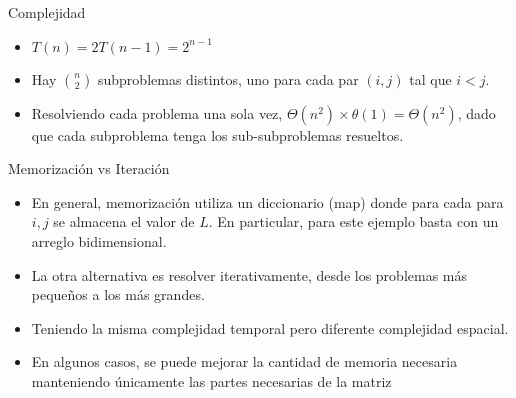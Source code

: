 \documentclass[]{beamer}
\begin{document}
\begin{frame}{Complejidad}
  \begin{itemize}
    \item $T(n) = 2T(n-1) = 2^{n-1}$ 
      \pause
    \item Hay $\binom{n}{2}$ subproblemas distintos, uno para cada par $(i,j)$ tal que $i<j$. 
      \pause
    \item Resolviendo cada problema una sola vez, $\Theta(n^2) \times \theta(1) = \Theta(n^2)$, dado que cada subproblema tenga los sub-subproblemas resueltos.
  \end{itemize}
\end{frame}

\begin{frame}{Memorizaci\'on vs Iteraci\'on}
  \begin{itemize}
    \item En general, memorizaci\'on utiliza un diccionario (map) donde para cada para $i,j$ se almacena el valor de $L$. En particular, para este ejemplo basta con un arreglo bidimensional.
      \pause
    \item La otra alternativa es resolver iterativamente, desde los problemas m\'as peque\~nos a los m\'as grandes.
      \pause
    \item Teniendo la misma complejidad temporal pero diferente complejidad espacial.
      \pause
    \item En algunos casos, se puede mejorar la cantidad de memoria necesaria manteniendo \'unicamente las partes necesarias de la matriz
  \end{itemize}
\end{frame}

\end{document}
